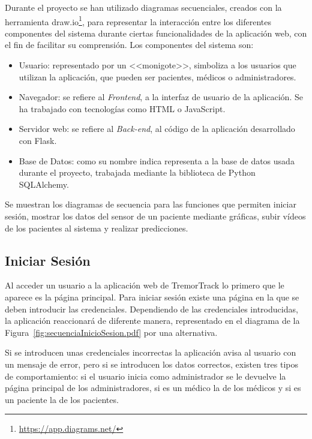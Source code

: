 Durante el proyecto se han utilizado diagramas secuenciales, creados con la herramienta draw.io\footnote{\url{https://app.diagrams.net/}}, para representar la interacción entre los diferentes componentes del sistema durante ciertas funcionalidades de la aplicación web, con el fin de facilitar su comprensión. Los componentes del sistema son: 
\begin{itemize}
    \item Usuario: representado por un <<monigote>>, simboliza a los usuarios que utilizan la aplicación, que pueden ser pacientes, médicos o administradores.
    \item Navegador: se refiere al \textit{Frontend}, a la interfaz de usuario de la aplicación. Se ha trabajado con tecnologías como HTML o JavaScript.
    \item Servidor web: se refiere al \textit{Back-end}, al código de la aplicación desarrollado con Flask.
    \item Base de Datos: como su nombre indica representa a la base de datos usada durante el proyecto, trabajada mediante la biblioteca de Python SQLAlchemy.
\end{itemize}

Se muestran los diagramas de secuencia para las funciones que permiten iniciar sesión, mostrar los datos del sensor de un paciente mediante gráficas, subir vídeos de los pacientes al sistema y realizar predicciones.


\subsection{Iniciar Sesión}
Al acceder un usuario a la aplicación web de TremorTrack lo primero que le aparece es la página principal. Para iniciar sesión existe una página en la que se deben introducir las credenciales. Dependiendo de las credenciales introducidas, la aplicación reaccionará de diferente manera, representado en el diagrama de la Figura~\ref{fig:secuenciaInicioSesion.pdf} por una alternativa. 

Si se introducen unas credenciales incorrectas la aplicación avisa al usuario con un mensaje de error, pero si se introducen los datos correctos, existen tres tipos de comportamiento: si el usuario inicia como administrador se le devuelve la página principal de los administradores, si es un médico la de los médicos y si es un paciente la de los pacientes. 




